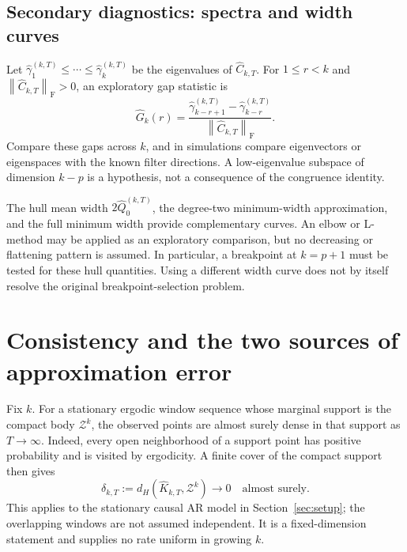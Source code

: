 \documentclass[11pt,a4paper]{article}
\newcommand{\norm}[1]{\left\lVert #1\right\rVert}
\newcommand{\Frob}{\mathrm F}
\newcommand{\hQ}{\widehat Q}
\newcommand{\hC}{\widehat C}
\begin{document}
\subsection*{Secondary diagnostics: spectra and width curves}
Let $\widehat\gamma_1^{(k,T)}\le\cdots\le\widehat\gamma_k^{(k,T)}$ be the
eigenvalues of $\hC_{k,T}$. For $1\le r<k$ and $\norm{\hC_{k,T}}_{\Frob}>0$,
an exploratory gap statistic is
\[
 \widehat G_k(r)=
 \frac{\widehat\gamma_{k-r+1}^{(k,T)}-\widehat\gamma_{k-r}^{(k,T)}}
 {\norm{\hC_{k,T}}_{\Frob}}.
\]
Compare these gaps across $k$, and in simulations compare eigenvectors or
eigenspaces with the known filter directions. A low-eigenvalue subspace of
dimension $k-p$ is a hypothesis, not a consequence of the congruence identity.

The hull mean width $2\hQ_0^{(k,T)}$, the degree-two minimum-width approximation,
and the full minimum width provide complementary curves. An elbow or L-method
may be applied as an exploratory comparison, but no decreasing or flattening
pattern is assumed. In particular, a breakpoint at $k=p+1$ must be tested for
these hull quantities. Using a different width curve does not by itself resolve
the original breakpoint-selection problem.

\newpage
\section{Consistency and the two sources of approximation error}\label{sec:consistency}
Fix $k$. For a stationary ergodic window sequence whose marginal support is the
compact body $\mathcal Z^k$, the observed points are almost surely dense in that
support as $T\to\infty$. Indeed, every open neighborhood of a support point has
positive probability and is visited by ergodicity. A finite cover of the compact
support then gives
\[
 \delta_{k,T}:=d_H(\widehat K_{k,T},\mathcal Z^k)\longrightarrow0
 \quad\text{almost surely}.
\]
This applies to the stationary causal AR model in Section~\ref{sec:setup}; the
overlapping windows are not assumed independent. It is a fixed-dimension
statement and supplies no rate uniform in growing $k$.
\end{document}
